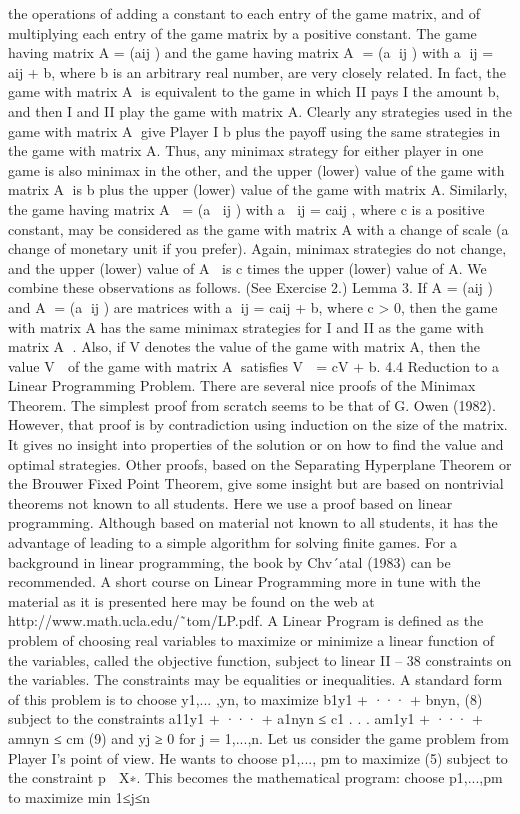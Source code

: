 the operations of adding a constant to each entry of the game matrix, and of multiplying
each entry of the game matrix by a positive constant. The game having matrix A = (aij )
and the game having matrix A = (a
ij ) with a
ij = aij + b, where b is an arbitrary real
number, are very closely related. In fact, the game with matrix A is equivalent to the
game in which II pays I the amount b, and then I and II play the game with matrix A.
Clearly any strategies used in the game with matrix A give Player I b plus the payoff
using the same strategies in the game with matrix A. Thus, any minimax strategy for
either player in one game is also minimax in the other, and the upper (lower) value of the
game with matrix A is b plus the upper (lower) value of the game with matrix A.
Similarly, the game having matrix A = (a
ij ) with a
ij = caij , where c is a positive
constant, may be considered as the game with matrix A with a change of scale (a change
of monetary unit if you prefer). Again, minimax strategies do not change, and the upper
(lower) value of A is c times the upper (lower) value of A. We combine these observations
as follows. (See Exercise 2.)
Lemma 3. If A = (aij ) and A = (a
ij ) are matrices with a
ij = caij + b, where c > 0,
then the game with matrix A has the same minimax strategies for I and II as the game
with matrix A
. Also, if V denotes the value of the game with matrix A, then the value
V  of the game with matrix A satisfies V  = cV + b.
4.4 Reduction to a Linear Programming Problem. There are several nice proofs
of the Minimax Theorem. The simplest proof from scratch seems to be that of G. Owen
(1982). However, that proof is by contradiction using induction on the size of the matrix.
It gives no insight into properties of the solution or on how to find the value and optimal
strategies. Other proofs, based on the Separating Hyperplane Theorem or the Brouwer
Fixed Point Theorem, give some insight but are based on nontrivial theorems not known
to all students.
Here we use a proof based on linear programming. Although based on material not
known to all students, it has the advantage of leading to a simple algorithm for solving
finite games. For a background in linear programming, the book by Chv´atal (1983) can be
recommended. A short course on Linear Programming more in tune with the material as
it is presented here may be found on the web at http://www.math.ucla.edu/˜tom/LP.pdf.
A Linear Program is defined as the problem of choosing real variables to maximize or
minimize a linear function of the variables, called the objective function, subject to linear
II – 38
constraints on the variables. The constraints may be equalities or inequalities. A standard
form of this problem is to choose y1,... ,yn, to
maximize b1y1 + ··· + bnyn, (8)
subject to the constraints
a11y1 + ··· + a1nyn ≤ c1
.
.
.
am1y1 + ··· + amnyn ≤ cm
(9)
and
yj ≥ 0 for j = 1,...,n.
Let us consider the game problem from Player I’s point of view. He wants to choose
p1,..., pm to maximize (5) subject to the constraint p ∈ X∗. This becomes the mathematical
program: choose p1,...,pm to
maximize min
1≤j≤n

